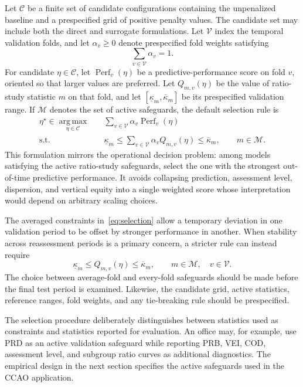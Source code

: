 \documentclass[10pt]{article}
\theoremstyle{definition}
\newcommand{\1}{\mathbf{1}}
\newcommand{\argmaxop}{\operatorname*{arg\,max}}
\begin{document}
{{{Let \(\mathcal C\) be a finite set of candidate configurations containing the unpenalized baseline and a prespecified grid of positive penalty values. The candidate set may include both the direct and surrogate formulations. Let \(\mathcal V\) index the temporal validation folds, and let \(\alpha_v\ge 0\) denote prespecified fold weights satisfying
\[
\sum_{v\in\mathcal V}\alpha_v=1.
\]
For candidate \(\eta\in\mathcal C\), let \(\operatorname{Perf}_v(\eta)\) be a predictive-performance score on fold \(v\), oriented so that larger values are preferred. Let \(Q_{m,v}(\eta)\) be the value of ratio-study statistic \(m\) on that fold, and let \([\underline\kappa_m,\overline\kappa_m]\) be its prespecified validation range. If \(\mathcal M\) denotes the set of active safeguards, the default selection rule is
\begin{align}
\label{eq:selection}
\eta^\star
\in
\argmaxop_{\eta\in\mathcal C}
\quad
& \sum_{v\in\mathcal V}
\alpha_v\operatorname{Perf}_v(\eta)
\\
\text{s.t.}\quad
&
\underline\kappa_m
\le
\sum_{v\in\mathcal V}
\alpha_v Q_{m,v}(\eta)
\le
\overline\kappa_m,
\qquad
m\in\mathcal M.
\nonumber
\end{align}
This formulation mirrors the operational decision problem: among models satisfying the active ratio-study safeguards, select the one with the strongest out-of-time predictive performance. It avoids collapsing prediction, assessment level, dispersion, and vertical equity into a single weighted score whose interpretation would depend on arbitrary scaling choices.

The averaged constraints in~\eqref{eq:selection} allow a temporary deviation in one validation period to be offset by stronger performance in another. When stability across reassessment periods is a primary concern, a stricter rule can instead require
\[
\underline\kappa_m
\le
Q_{m,v}(\eta)
\le
\overline\kappa_m,
\qquad
m\in\mathcal M,\quad v\in\mathcal V.
\]
The choice between average-fold and every-fold safeguards should be made before the final test period is examined. Likewise, the candidate grid, active statistics, reference ranges, fold weights, and any tie-breaking rule should be prespecified.

The selection procedure deliberately distinguishes between statistics used as constraints and statistics reported for evaluation. An office may, for example, use PRD as an active validation safeguard while reporting PRB, VEI, COD, assessment level, and subgroup ratio curves as additional diagnostics. The empirical design in the next section specifies the active safeguards used in the CCAO application.

}}}
\end{document}
